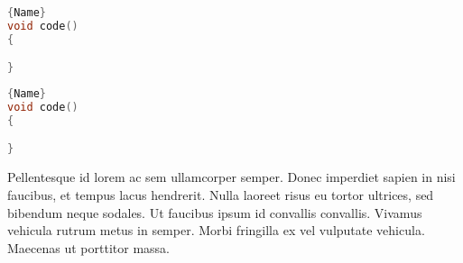 \noindent\begin{minipage}{.45\textwidth}
\begin{lstlisting}[language=C++, caption=code 1 with a long and wrapping title,frame=tb]{Name}
void code()
{

}
\end{lstlisting}
\end{minipage}\hfill
\begin{minipage}{.45\textwidth}
\begin{lstlisting}[language=C++, caption=code 2 with a long and wrapping title,frame=tb]{Name}
void code()
{

}
\end{lstlisting}
\end{minipage}

Pellentesque id lorem ac sem ullamcorper semper. Donec imperdiet sapien in nisi faucibus, et tempus lacus hendrerit. Nulla laoreet risus eu tortor ultrices, sed bibendum neque sodales. Ut faucibus ipsum id convallis convallis. Vivamus vehicula rutrum metus in semper. Morbi fringilla ex vel vulputate vehicula. Maecenas ut porttitor massa.





